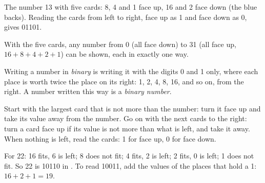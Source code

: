 \begin{omfigure}

{\small The number 13 with five cards: 8, 4 and 1 face up, 16 and 2 face down
(the blue backs). Reading the cards from left to right, face up as 1 and face
down as 0, gives 01101.}
\label{fig:g5:bits-and-bytes:cards}
\end{omfigure}

With the five cards, any number from 0 (all face down) to 31 (all face up,
$16 + 8 + 4 + 2 + 1$) can be shown, each in exactly one way.

\begin{definition}[Binary]\label{def:g5:bits-and-bytes:binary}
Writing a number in \emph{binary} is writing it with the
digits 0 and 1 only, where each place is worth twice the place on its right:
1, 2, 4, 8, 16, and so on, from the right. A number written this way is a
\emph{binary number}.
\end{definition}

\begin{method}\label{met:g5:bits-and-bytes:to-binary}
Start with the largest card that is not more than the number: turn it face up
and take its value away from the number. Go on with the next cards to the
right: turn a card face up if its value is not more than what is left, and
take it away. When nothing is left, read the cards: 1 for face up, 0 for face
down.
\end{method}

\begin{example}\label{ex:g5:bits-and-bytes:22}
For 22: 16 fits, 6 is left; 8 does not fit; 4 fits, 2 is left; 2 fits, 0 is
left; 1 does not fit. So 22 is 10110 in . To read 10011, add the values
of the places that hold a 1: $16 + 2 + 1 = 19$.
\end{example}


